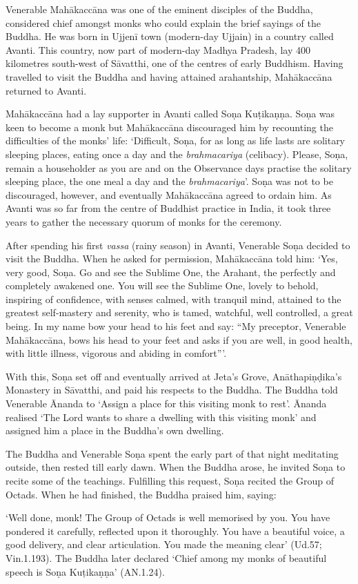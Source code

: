 
Venerable Mahākaccāna was one of the eminent disciples of the Buddha, considered chief amongst monks who could explain the brief sayings of the Buddha. He was born in Ujjenī town (modern-day Ujjain) in a country called Avanti. This country, now part of modern-day Madhya Pradesh, lay 400 kilometres south-west of Sāvatthi, one of the centres of early Buddhism. Having travelled to visit the Buddha and having attained arahantship, Mahākaccāna returned to Avanti.

Mahākaccāna had a lay supporter in Avanti called Soṇa Kuṭikaṇṇa. Soṇa was keen to become a monk but Mahākaccāna discouraged him by recounting the difficulties of the monks' life: `Difficult, Soṇa, for as long as life lasts are solitary sleeping places, eating once a day and the \textit{brahmacariya} (celibacy). Please, Soṇa, remain a householder as you are and on the Observance days practise the solitary sleeping place, the one meal a day and the \textit{brahmacariya}'.
Soṇa was not to be discouraged, however, and eventually Mahākaccāna agreed to ordain him. As Avanti was so far from the centre of Buddhist practice in India, it took three years to gather the necessary quorum of monks for the ceremony.

After spending his first \textit{vassa} (rainy season) in Avanti, Venerable Soṇa decided to visit the Buddha. When he asked for permission, Mahākaccāna told him: `Yes, very good, Soṇa. Go and see the Sublime One, the Arahant, the perfectly and completely awakened one. You will see the Sublime One, lovely to behold, inspiring of confidence, with senses calmed, with tranquil mind, attained to the greatest self-mastery and serenity, who is tamed, watchful, well controlled, a great being. In my name bow your head to his feet and say: ``My preceptor, Venerable Mahākaccāna, bows his head to your feet and asks if you are well, in good health, with little illness, vigorous and abiding in comfort''\thinspace'.

With this, Soṇa set off and eventually arrived at Jeta's Grove, Anāthapiṇḍika's Monastery in Sāvatthi, and paid his respects to the Buddha. The Buddha told Venerable Ānanda to `Assign a place for this visiting monk to rest'. Ānanda realised `The Lord wants to share a dwelling with this visiting monk' and assigned him a place in the Buddha's own dwelling.

The Buddha and Venerable Soṇa spent the early part of that night meditating outside, then rested till early dawn. When the Buddha arose, he invited Soṇa to recite some of the teachings. Fulfilling this request, Soṇa recited the Group of Octads. When he had finished, the Buddha praised him, saying:

`Well done, monk! The Group of Octads is well memorised by you. You have pondered it carefully, reflected upon it thoroughly. You have a beautiful voice, a good delivery, and clear articulation. You made the meaning clear' (Ud.57; Vin.1.193). The Buddha later declared `Chief among my monks of beautiful speech is Soṇa Kuṭikaṇṇa' (AN.1.24).
